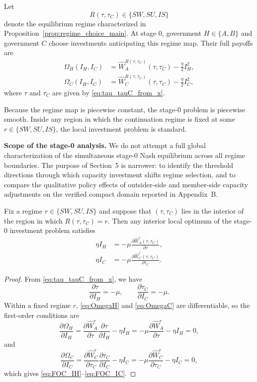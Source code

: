 Let
\[
R(\tau,\tau_C)\in\{SW,SU,IS\}
\]
denote the equilibrium regime characterized in
Proposition~\ref{prop:regime_choice_main}. At stage 0, government
$H\in\{A,B\}$ and government $C$ choose investments anticipating this regime
map. Their full payoffs are
\begin{align}
\Omega_H(I_H,I_C)
&=
\widehat W_A^{R(\tau,\tau_C)}(\tau,\tau_C)
-\frac{\eta}{2}I_H^2, \label{eq:OmegaH}\\
\Omega_C(I_H,I_C)
&=
\widehat W_C^{R(\tau,\tau_C)}(\tau,\tau_C)
-\frac{\eta}{2}I_C^2, \label{eq:OmegaC}
\end{align}
where $\tau$ and $\tau_C$ are given by \eqref{eq:tau_tauC_from_x}.

Because the regime map is piecewise constant, the stage-0 problem is piecewise
smooth. Inside any region in which the continuation regime is fixed at some
$r\in\{SW,SU,IS\}$, the local investment problem is standard.

\noindent\textbf{Scope of the stage-0 analysis.}
We do not attempt a full global characterization of the simultaneous stage-0
Nash equilibrium across all regime boundaries. The purpose of Section~5 is
narrower: to identify the threshold directions through which capacity
investment shifts regime selection, and to compare the qualitative policy
effects of outsider-side and member-side capacity adjustments on the verified
compact domain reported in Appendix~B.

\begin{lemma}
\label{lem:local_investment_condition}
Fix a regime $r\in\{SW,SU,IS\}$ and suppose that $(\tau,\tau_C)$ lies in the
interior of the region in which $R(\tau,\tau_C)=r$. Then any interior local
optimum of the stage-0 investment problem satisfies
\begin{align}
\eta I_H &= -\mu \frac{\partial \widehat W_A^r(\tau,\tau_C)}{\partial \tau},
\label{eq:FOC_IH}\\
\eta I_C &= -\mu \frac{\partial \widehat W_C^r(\tau,\tau_C)}{\partial \tau_C}.
\label{eq:FOC_IC}
\end{align}
\end{lemma}

\begin{proof}
From \eqref{eq:tau_tauC_from_x}, we have
\[
\frac{\partial \tau}{\partial I_H}=-\mu,
\qquad
\frac{\partial \tau_C}{\partial I_C}=-\mu.
\]
Within a fixed regime $r$, \eqref{eq:OmegaH} and \eqref{eq:OmegaC} are
differentiable, so the first-order conditions are
\[
\frac{\partial \Omega_H}{\partial I_H}
=
\frac{\partial \widehat W_A^r}{\partial \tau}\frac{\partial \tau}{\partial I_H}
-\eta I_H
=
-\mu\frac{\partial \widehat W_A^r}{\partial \tau}
-\eta I_H
=0,
\]
and
\[
\frac{\partial \Omega_C}{\partial I_C}
=
\frac{\partial \widehat W_C^r}{\partial \tau_C}\frac{\partial \tau_C}{\partial I_C}
-\eta I_C
=
-\mu\frac{\partial \widehat W_C^r}{\partial \tau_C}
-\eta I_C
=0,
\]
which gives \eqref{eq:FOC_IH}--\eqref{eq:FOC_IC}.
\end{proof}

